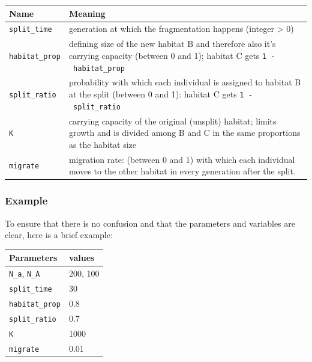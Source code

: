 \documentclass[
]{article}
\begin{document}
\begin{longtable}[]{@{}
  >{\raggedright\arraybackslash}p{}
  >{\raggedright\arraybackslash}p{}@{}}
\toprule\noalign{}
\begin{minipage}[b]{\linewidth}\raggedright
Name
\end{minipage} & \begin{minipage}[b]{\linewidth}\raggedright
Meaning
\end{minipage} \\
\midrule\noalign{}
\endhead
\bottomrule\noalign{}
\endlastfoot
\texttt{split\_time} & generation at which the fragmentation happens
(integer \textgreater{} 0) \\
\texttt{habitat\_prop} & defining size of the new habitat B and
therefore also it's carrying capacity (between 0 and 1); habitat C gets
\texttt{1\ -\ habitat\_prop} \\
\texttt{split\_ratio} & probability with which each individual is
assigned to habitat B at the split (between 0 and 1): habitat C gets
\texttt{1\ -\ split\_ratio} \\
\texttt{K} & carrying capacity of the original (unsplit) habitat; limits
growth and is divided among B and C in the same proportions as the
habitat size \\
\texttt{migrate} & migration rate: (between 0 and 1) with which each
individual moves to the other habitat in every generation after the
split. \\
\end{longtable}

\subsubsection{Example}\label{example}

To ensure that there is no confusion and that the parameters and
variables are clear, here is a brief example:

\begin{longtable}[]{@{}ll@{}}
\toprule\noalign{}
Parameters & values \\
\midrule\noalign{}
\endhead
\bottomrule\noalign{}
\endlastfoot
\texttt{N\_a}, \texttt{N\_A} & 200, 100 \\
\texttt{split\_time} & 30 \\
\texttt{habitat\_prop} & 0.8 \\
\texttt{split\_ratio} & 0.7 \\
\texttt{K} & 1000 \\
\texttt{migrate} & 0.01 \\
\end{longtable}
\end{document}
